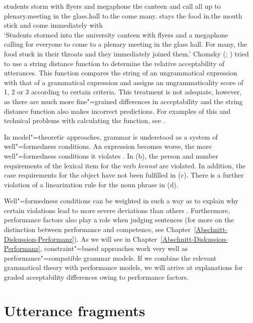 students storm with flyers and megaphone the canteen and call all up to plenary.meeting in the glass.hall to.the come many.\dat{} stays the food in.the mouth stick and come immediately with\\
\glt `Students stormed into the university canteen with flyers and a megaphone calling for everyone to come to a plenary meeting
in the glass hall. For many, the food stuck in their throats and they immediately joined them.'
\z
Chomsky (\citeyear[Chapter~5]{Chomsky75a}; \citeyear{Chomsky64a}) tried to use a string distance function to determine the relative
acceptability of utterances. This function compares the string of an ungrammatical expression with that of a grammatical expression
and assigns an ungrammaticality score of 1, 2 or 3 according to certain criteria. This treatment is not adequate, however, as there
are much more fine"=grained differences in acceptability and the string distance function also makes incorrect predictions.
For examples of this and technical problems with calculating the function, see .

In model"=theoretic approaches, grammar is understood as a system of well"=formedness conditions. An expression becomes worse, the
more well"=formedness conditions it violates \citep[--27]{PS2001a}. In (b), the person and number requirements of
the lexical item for the verb \emph{kennst} are violated. In addition, the case requirements for the object have not been fulfilled in
(c). There is a further violation of a linearization rule for the noun phrase in (d).

Well"=formedness conditions can be weighted in such a way as to explain why certain violations lead to more severe deviations than
others \citep{SK2005a}. Furthermore, performance factors also play a role when judging sentences (for more on the distinction between performance
and competence, see Chapter~\ref{Abschnitt-Diskussion-Performanz}). As we will see in Chapter~\ref{Abschnitt-Diskussion-Performanz},
constraint"=based approaches work very well as performance"=compatible grammar models. If we combine the relevant grammatical theory
with performance models, we will arrive at explanations for graded acceptability differences owing to performance factors.

\section{Utterance fragments}

